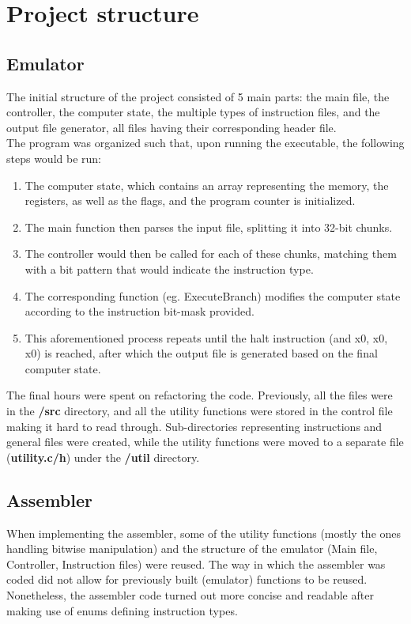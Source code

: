 \documentclass{article}
\begin{document}
\section{Project structure}

\subsection{Emulator}
The initial structure of the project consisted of 5 main parts: the main file, the controller, the computer state, the multiple types of instruction files, and the output file generator, all files having their corresponding header file.\\

The program was organized such that, upon running the executable, the following steps would be run:
\begin{enumerate}
    \item The computer state, which contains an array representing the memory, the registers, as well as the flags, and the program counter is initialized.
    \item The main function then parses the input file, splitting it into 32-bit chunks.
    \item The controller would then be called for each of these chunks, matching them with a bit pattern that would indicate the instruction type.
    \item The corresponding function (eg. ExecuteBranch) modifies the computer state according to the instruction bit-mask provided.
    \item This aforementioned process repeats until the halt instruction (and x0, x0, x0) is reached, after which the output file is generated based on the final computer state.
    
\end{enumerate}

The final hours were spent on refactoring the code. Previously, all the files were in the \textbf{/src} directory, and all the utility functions were stored in the control file making it hard to read through. Sub-directories representing instructions and general files were created, while the utility functions were moved to a separate file (\textbf{utility.c/h}) under the \textbf{/util} directory.

\subsection{Assembler}
When implementing the assembler, some of the utility functions (mostly the ones handling bitwise manipulation) and the structure of the emulator (Main file, Controller, Instruction files) were reused. The way in which the assembler was coded did not allow for previously built (emulator) functions to be reused. Nonetheless, the assembler code turned out more concise and readable after making use of enums defining instruction types.
\end{document}
